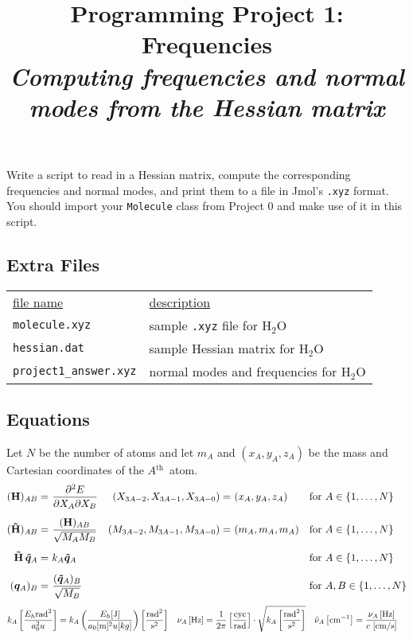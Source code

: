 \documentclass[fleqn]{article}
\title{Programming Project 1: Frequencies\\
\textit{Computing frequencies and normal modes from the Hessian matrix}}
\author{}
\date{}
\newcommand{\linl}[1]{\lstinline{#1}{}}
\newcommand{\eth}{\ensuremath{^\text{th}}}
\newcommand{\tl}{\ensuremath{\tilde}}
\newcommand{\ul}[1]{\underline{#1}}
\newcommand{\ld}{\ensuremath{\ldots}}
\newcommand{\mr}[1]{\ensuremath{\mathrm{#1}}}
\newcommand{\bo}[1]{\ensuremath{\mathbf{#1}}}
\newcommand{\fr}[2]{\ensuremath{\dfrac{#1}{#2}}}
\newcommand{\pd}[2]{\ensuremath{\frac{\partial#1}{\partial#2}}}
\newcommand{\pt}{\ensuremath{\partial}}
\newcommand{\rad}{\ensuremath{\mr{rad}}}
\begin{document}
\maketitle
\vspace{-1cm}
\noindent
Write a script to read in a Hessian matrix, compute the corresponding frequencies and normal modes, and print them to a file in Jmol's \linl{.xyz} format.
You should import your \linl{Molecule} class from Project 0 and make use of it in this script.

\subsection*{Extra Files}
\begin{center}
\begin{tabular}{p{}@{}p{}}
  \ul{file name} & \ul{description} \\
  \linl{molecule.xyz}
  & sample \linl{.xyz} file for H$_2$O \\ 
  \linl{hessian.dat}
  & sample Hessian matrix for H$_2$O \\
  \linl{project1_answer.xyz}
  & normal modes and frequencies for H$_2$O
\end{tabular}
\end{center}


\subsection*{Equations}
Let $N$ be the number of atoms and let $m_A$ and $(x_A, y_A, z_A)$ be the mass and Cartesian coordinates of the $A$\eth\ atom.
\begin{align}
\label{hessian-dfn}
  (\bo{H})_{AB}
=&\
  \pd{^2E}{X_A\pt X_B}
&
  (X_{3A-2}, X_{3A-1}, X_{3A-0})=&\ (x_A, y_A, z_A)
&&
  \text{for $A\in\{1,\ld,N\}$}
\\[5pt]
\label{mwhessian-dfn}
  (\bo{\tl{H}})_{AB}
=&\
  \fr{(\bo{H})_{AB}}{\sqrt{M_AM_B}}
&
  (M_{3A-2}, M_{3A-1}, M_{3A-0})=&\ (m_A, m_A, m_A)
&&
  \text{for $A\in\{1,\ld,N\}$}
\\[5pt]
\label{mwhessian-eigh}
  \bo{\tl{H}}\hspace{2pt}\bm{\tl{q}}_A
=&\
  k_A\bm{\tl{q}}_A
&&&&
  \text{for $A\in\{1,\ld,N\}$}
\\[5pt]
\label{backtransform-eigvecs}
  (\bm{q}_A)_B
=&\
  \fr{(\bm{\tl{q}}_A)_B}{\sqrt{M_B}}
&&&&
  \text{for $A, B\in\{1,\ld,N\}$}
\end{align}
\begin{align}
\label{conversion}
&
  k_A \left[\fr{E_h\rad^2}{a_0^2u}\right]
=
  k_A \left(\fr{E_h[\mr{J}]}{a_0[\mr{m}]^2u[kg]}\right)
  \left[\fr{\rad^2}{\mr{s}^2}\right]
&&
  \nu_A \left[\mr{Hz}\right]
=
  \fr{1}{2\pi}\left[\fr{\mr{cyc}}{\rad}\right]
  \cdot
  \sqrt{k_A \left[\fr{\rad^2}{\mr{s}^2}\right]}
&&
  \tl{\nu}_A \left[\mr{cm}^{-1}\right]
=
  \fr{\nu_A\left[\mr{Hz}\right]}{c\ [\mr{cm}/\mr{s}]}
\end{align}
\end{document}
